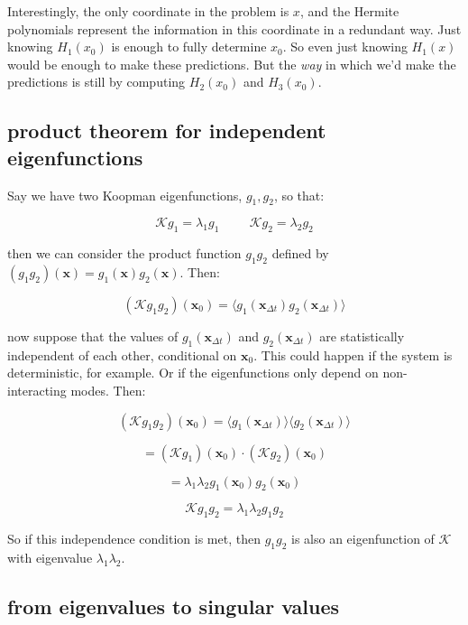 \documentclass[]{article}
\newcommand{\p}[1]{\left( #1 \right)}
\newcommand{\w}[1]{\mathbf{#1}}
\newcommand{\Kp}{\mathcal{K}}
\begin{document}
Interestingly, the only coordinate in the problem is $x$, and the Hermite polynomials represent the information in this coordinate in a redundant way. Just knowing $H_1(x_0)$ is enough to fully determine $x_0$. So even just knowing $H_1(x)$ would be enough to make these predictions. But the {\em way} in which we'd make the predictions is still by computing $H_2(x_0)$ and $H_3(x_0)$.

\subsection{product theorem for independent eigenfunctions}

Say we have two Koopman eigenfunctions, $g_1, g_2$, so that:

$$
\Kp g_1 = \lambda_1 g_1 \hspace{1cm} \Kp g_2 = \lambda_2 g_2
$$

then we can consider the product function $g_1g_2$ defined by $(g_1g_2)(\w{x}) = g_1(\w{x})g_2(\w{x})$. Then:

$$
\p{\Kp g_1g_2}(\w{x}_0) = \langle g_1(\w{x}_{\Delta t})g_2(\w{x}_{\Delta t})\rangle
$$

now suppose that the values of $g_1(\w{x}_{\Delta t})$ and $g_2(\w{x}_{\Delta t})$ are statistically independent of each other, conditional on $\w{x}_0$. This could happen if the system is deterministic, for example. Or if the eigenfunctions only depend on non-interacting modes. Then:

$$
\p{\Kp g_1g_2}(\w{x}_0) = \langle g_1(\w{x}_{\Delta t})\rangle\langle g_2(\w{x}_{\Delta t})\rangle
$$

$$
= (\Kp g_1)(\w{x}_0) \cdot (\Kp g_2)(\w{x}_0)
$$

$$
= \lambda_1\lambda_2 g_1(\w{x}_0) g_2(\w{x}_0)
$$

$$
\Kp g_1g_2 = \lambda_1\lambda_2 g_1 g_2
$$

So if this independence condition is met, then $g_1g_2$ is also an eigenfunction of $\Kp$ with eigenvalue $\lambda_1\lambda_2$.




\subsection{from eigenvalues to singular values}


\end{document}
